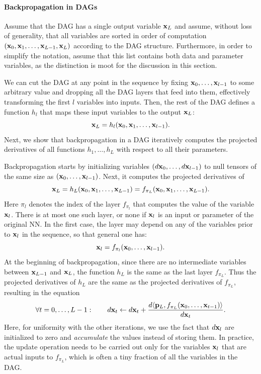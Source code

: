 \paragraph{Backpropagation in DAGs}\label{s:dag}

Assume that the DAG has a single output variable $\mathbf{x}_L$ and assume, without loss of generality, that all variables are sorted in order of computation $(\mathbf{x}_0,\mathbf{x}_1,\dots,\mathbf{x}_{L-1},\mathbf{x}_L)$ according to the DAG structure. Furthermore, in order to simplify the notation, assume that this list contains both data and parameter variables, as the distinction is moot for the discussion in this section.

We can cut the DAG at any point in the sequence by fixing $\mathbf{x}_0, \dots, \mathbf{x}_{l-1}$ to some arbitrary value and dropping all the DAG layers that feed into them, effectively transforming the first $l$ variables into inputs. Then, the rest of the DAG defines a function $h_l$ that maps these input variables to the output $\mathbf{x}_L$:
\[
\mathbf{x}_L = h_l(\mathbf{x}_0,\mathbf{x}_1,\dots,\mathbf{x}_{l-1}).
\]
Next, we show that backpropagation in a DAG iteratively computes the projected derivatives of all functions $h_1,\dots,h_L$ with respect to all their parameters.

Backpropagation starts by initializing variables $(d\mathbf{x}_{0},\dots,d\mathbf{x}_{l-1})$ to null tensors of the same size as $(\mathbf{x}_0,\dots,\mathbf{x}_{l-1})$. Next, it computes the projected derivatives of
\[
\mathbf{x}_L = h_L(\mathbf{x}_0,\mathbf{x}_1,\dots,\mathbf{x}_{L-1}) =
f_{\pi_L}(\mathbf{x}_0,\mathbf{x}_1,\dots,\mathbf{x}_{L-1}).
\]
Here $\pi_l$ denotes the index of the layer $f_{\pi_l}$ that computes the value of the variable $\mathbf{x}_l$. There is at most one such layer, or none if $\mathbf{x}_l$ is an input or parameter of the original NN. In the first case, the layer may depend on any of the variables prior to $\mathbf{x}_l$ in the sequence, so that general one has:
\[
\mathbf{x}_{l} = f_{\pi_l}(\mathbf{x}_0,\dots,\mathbf{x}_{l-1}).
\]
At the beginning of backpropagation, since there are no intermediate variables between $\mathbf{x}_{L-1}$ and $\mathbf{x}_L$, the function $h_L$ is the same as the last layer $f_{\pi_L}$. Thus the projected derivatives of $h_L$ are the same as the projected derivatives of $f_{\pi_L}$, resulting in the equation
\[
\forall t=0,\dots,L-1:\qquad
d\mathbf{x}_{t} \leftarrow d\mathbf{x}_{t}
+ \frac{d\langle \mathbf{p}_L, f_{\pi_L}(\mathbf{x}_0,\dots,\mathbf{x}_{t-1})\rangle}{d\mathbf{x}_t}.
\]
Here, for uniformity with the other iterations, we use the fact that $d\mathbf{x}_l$ are initialized to zero and \emph{accumulate} the values instead of storing them. In practice, the update operation needs to be carried out only for the variables $\mathbf{x}_l$ that are actual inputs to $f_{\pi_L}$, which is often a tiny fraction of all the variables in the DAG.

